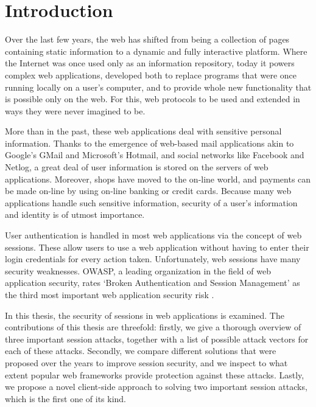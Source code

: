 \chapter{Introduction}

Over the last few years, the web has shifted from being a collection of pages containing static information to a dynamic and fully interactive platform. Where the Internet was once used only as an information repository, today it powers complex web applications, developed both to replace programs that were once running locally on a user's computer, and to provide whole new functionality that is possible only on the web. For this, web protocols to be used and extended in ways they were never imagined to be.

More than in the past, these web applications deal with sensitive personal information. Thanks to the emergence of web-based mail applications akin to Google's GMail and Microsoft's Hotmail, and social networks like Facebook and Netlog, a great deal of user information is stored on the servers of web applications. Moreover, shops have moved to the on-line world, and payments can be made on-line by using on-line banking or credit cards. Because many web applications handle such sensitive information, security of a user's information and identity is of utmost importance.

User authentication is handled in most web applications via the concept of web sessions. These allow users to use a web application without having to enter their login credentials for every action taken. Unfortunately, web sessions have many security weaknesses. OWASP, a leading organization in the field of web application security, rates `Broken Authentication and Session Management' as the third most important web application security risk \cite{Williams2010}.

In this thesis, the security of sessions in web applications is examined. The contributions of this thesis are threefold: firstly, we give a thorough overview of three important session attacks, together with a list of possible attack vectors for each of these attacks. Secondly, we compare different solutions that were proposed over the years to improve session security, and we inspect to what extent popular web frameworks provide protection against these attacks. Lastly, we propose a novel client-side approach to solving two important session attacks, which is the first one of its kind.
